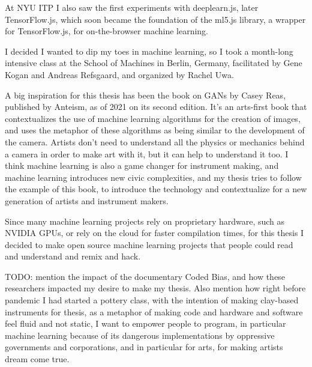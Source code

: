 At NYU ITP I also saw the first experiments with deeplearn.js, later TensorFlow.js, which soon became the foundation of the ml5.js library, a wrapper for TensorFlow.js, for on-the-browser machine learning.

I decided I wanted to dip my toes in machine learning, so I took a month-long intensive class at the School of Machines in Berlin, Germany, facilitated by Gene Kogan and Andreas Refsgaard, and organized by Rachel Uwa.

A big inspiration for this thesis has been the book on GANs by Casey Reas, published by Anteism, as of 2021 on its second edition. It’s an arts-first book that contextualizes the use of machine learning algorithms for the creation of images, and uses the metaphor of these algorithms as being similar to the development of the camera. Artists don’t need to understand all the physics or mechanics behind a camera in order to make art with it, but it can help to understand it too. I think machine learning is also a game changer for instrument making, and machine learning introduces new civic complexities, and my thesis tries to follow the example of this book, to introduce the technology and contextualize for a new generation of artists and instrument makers.

Since many machine learning projects rely on proprietary hardware, such as NVIDIA GPUs, or rely on the cloud for faster compilation times, for this thesis I decided to make open source machine learning projects that people could read and understand and remix and hack.

TODO: mention the impact of the documentary Coded Bias, and how these researchers impacted my desire to make my thesis. Also mention how right before pandemic I had started a pottery class, with the intention of making clay-based instruments for thesis, as a metaphor of making code and hardware and software feel fluid and not static, I want to empower people to program, in particular machine learning because of its dangerous implementations by oppressive governments and corporations, and in particular for arts, for making artists dream come true.
